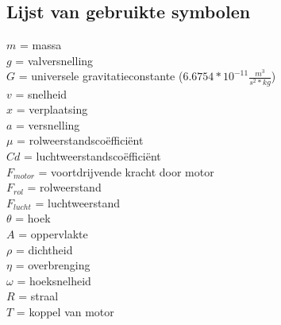 \subsection{Lijst van gebruikte symbolen}
$m$ = massa\\
$g$ = valversnelling\\
$G$ = universele gravitatieconstante ($6.6754*10^{-11} \frac{m^3}{s^2*kg}$)\\
$v$ = snelheid\\
$x$ = verplaatsing\\
$a$ = versnelling\\
$\mu$ = rolweerstandsco\"effici\"ent\\ 
$Cd$ = luchtweerstandsco\"effici\"ent\\
$F_{motor}$ = voortdrijvende kracht door motor\\
$F_{rol}$ = rolweerstand\\
$F_{lucht}$ = luchtweerstand\\
$\theta$ = hoek\\
$A$ = oppervlakte\\
$\rho$ = dichtheid\\
$\eta$ = overbrenging\\
$\omega$ = hoeksnelheid\\
$R$ = straal\\
$T$ = koppel van motor\\

